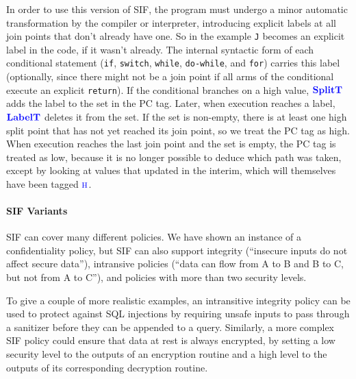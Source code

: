 \documentclass{llncs}
\begin{document}
In order to use this version of SIF, the program must undergo a minor automatic transformation
by the compiler or interpreter, introducing
explicit labels at all join points that don't already have one. 
So in the example {\tt J} becomes an explicit label in the code, if it wasn't already. 
The internal syntactic form of each conditional statement ({\tt if}, {\tt switch}, {\tt while}, {\tt do-while}, and {\tt for})
carries this label (optionally, since there might not be a join point if all arms of the conditional execute an explicit {\tt return}).
If the conditional branches on a high value, \(\color{blue} \mathbf{SplitT}\) adds the label to the set
in the PC tag. Later, when execution reaches a label, \(\color{blue} \mathbf{LabelT}\) deletes it from the
set. If the set is non-empty, there is at least one high split point that has not
yet reached its join point, so we treat the PC tag as high. When execution reaches the
last join point and the set is empty, the PC tag is treated as low, because it is no longer possible to deduce which
path was taken, except by looking at values that updated in the interim, which
will themselves have been tagged \(\textnormal{\color{blue} \sc h}\). 

\paragraph*{SIF Variants}

SIF can cover many different policies. We have shown an instance of
a confidentiality policy, but SIF can also support integrity
(``insecure inputs do not affect secure data''), intransive policies
(``data can flow from A to B and B to C, but not from A to C''), and policies with
more than two security levels.

To give a couple of more realistic examples, an intransitive integrity policy
can be used to protect against SQL injections by requiring unsafe inputs to pass through a sanitizer
before they can be appended to a query. Similarly, a more complex SIF policy could ensure that
data at rest is always encrypted, by setting a low security level to the outputs of an encryption
routine and a high level to the outputs of its corresponding decryption routine.
\end{document}
